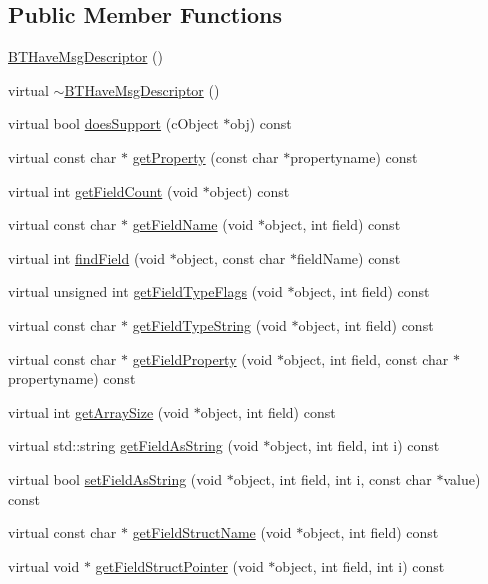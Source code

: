 \subsection*{Public Member Functions}
\begin{DoxyCompactItemize}
\item 
\hyperlink{classBTHaveMsgDescriptor_a47122cfe2da1fc3c7819a175b5518201}{B\+T\+Have\+Msg\+Descriptor} ()
\item 
virtual \hyperlink{classBTHaveMsgDescriptor_a99c4061e220b597aaf145a0df7e28451}{$\sim$\+B\+T\+Have\+Msg\+Descriptor} ()
\item 
virtual bool \hyperlink{classBTHaveMsgDescriptor_a6e0cdbefa40e5cad291dacba394dbde3}{does\+Support} (c\+Object $\ast$obj) const 
\item 
virtual const char $\ast$ \hyperlink{classBTHaveMsgDescriptor_aa0d67607845765dd784042b2ab545358}{get\+Property} (const char $\ast$propertyname) const 
\item 
virtual int \hyperlink{classBTHaveMsgDescriptor_a1a8a41164b0394edc137cfb3152216cd}{get\+Field\+Count} (void $\ast$object) const 
\item 
virtual const char $\ast$ \hyperlink{classBTHaveMsgDescriptor_ad6049591e96cf93920d09770796b6516}{get\+Field\+Name} (void $\ast$object, int field) const 
\item 
virtual int \hyperlink{classBTHaveMsgDescriptor_a9d240eeed7cb467614a992206e1eb0d8}{find\+Field} (void $\ast$object, const char $\ast$field\+Name) const 
\item 
virtual unsigned int \hyperlink{classBTHaveMsgDescriptor_acff1f15e67ce27c82b773f3eb2361bb5}{get\+Field\+Type\+Flags} (void $\ast$object, int field) const 
\item 
virtual const char $\ast$ \hyperlink{classBTHaveMsgDescriptor_adb26434199e3bdc22f5451328dd42d32}{get\+Field\+Type\+String} (void $\ast$object, int field) const 
\item 
virtual const char $\ast$ \hyperlink{classBTHaveMsgDescriptor_a550a5202ddc41e8221c9ac520ffb5e5d}{get\+Field\+Property} (void $\ast$object, int field, const char $\ast$propertyname) const 
\item 
virtual int \hyperlink{classBTHaveMsgDescriptor_ab697b1c15128aad322df05a176e29d50}{get\+Array\+Size} (void $\ast$object, int field) const 
\item 
virtual std\+::string \hyperlink{classBTHaveMsgDescriptor_adb607bc085f1a234baf538ddc32f4ea5}{get\+Field\+As\+String} (void $\ast$object, int field, int i) const 
\item 
virtual bool \hyperlink{classBTHaveMsgDescriptor_ab9dd0f93b3f475afc26618aaf148d829}{set\+Field\+As\+String} (void $\ast$object, int field, int i, const char $\ast$value) const 
\item 
virtual const char $\ast$ \hyperlink{classBTHaveMsgDescriptor_a349e7c07a026e15dda29968c8dae8234}{get\+Field\+Struct\+Name} (void $\ast$object, int field) const 
\item 
virtual void $\ast$ \hyperlink{classBTHaveMsgDescriptor_a8ae12b16db8ffb8b2b82f116b7998ddd}{get\+Field\+Struct\+Pointer} (void $\ast$object, int field, int i) const 
\end{DoxyCompactItemize}



